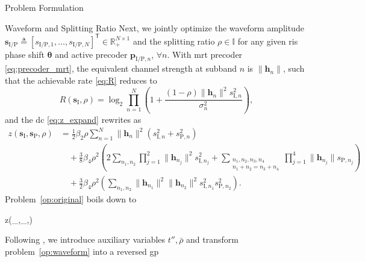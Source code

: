 \begin{section}{Problem Formulation}
	\begin{subsection}{Waveform and Splitting Ratio}
		Next, we jointly optimize the waveform amplitude $\mathbf{s}_{\mathrm{I/P}} \triangleq [s_{\mathrm{I/P},1},\dots,s_{\mathrm{I/P},N}]^\mathsf{T} \in \mathbb{R}_+^{N \times 1}$ and the splitting ratio $\rho \in \mathbb{I}$ for any given \gls{ris} phase shift $\boldsymbol{\theta}$ and active precoder $\mathbf{p}_{\mathrm{I/P},n}$, $\forall n$.
		With \gls{mrt} precoder \eqref{eq:precoder_mrt}, the equivalent channel strength at subband $n$ is $\lVert{\mathbf{h}_n}\rVert$, such that the achievable rate \eqref{eq:R} reduces to
		\begin{equation}\label{eq:R_waveform}
			R(\mathbf{s}_{\mathrm{I}},\rho) = \log_2\prod_{n=1}^N\left(1+\frac{(1-\rho)\lVert{\mathbf{h}_n}\rVert^2 s_{\mathrm{I},n}^2}{\sigma_n^2}\right),
		\end{equation}
		and the \gls{dc} \eqref{eq:z_expand} rewrites as
		\begin{equation}
			\begin{split}
				z(\mathbf{s}_{\mathrm{I}},\mathbf{s}_\mathrm{P},\rho)
				& = \frac{1}{2}{\beta_2}{\rho} \sum_{n=1}^N \lVert{\mathbf{h}_n}\rVert^2(s_{\mathrm{I},n}^2+s_{\mathrm{P},n}^2)\\
				& \quad + \frac{3}{8}{\beta_4}{\rho^2} \left( 2\sum_{n_1,n_2} \prod_{j=1}^2 \lVert{\mathbf{h}_{n_j}}\rVert^2 s_{\mathrm{I},{n_j}}^2 + \sum_{\substack{{n_1},{n_2},{n_3},{n_4}\\{n_1}+{n_2}={n_3}+{n_4}}} \prod_{j=1}^4 \lVert{\mathbf{h}_{n_j}}\rVert s_{\mathrm{P},{n_j}} \right)\\
				& \quad + \frac{3}{2}{\beta_4}{\rho^2} \left( \sum_{n_1,n_2} \lVert{\mathbf{h}_{n_1}}\rVert^2 \lVert{\mathbf{h}_{n_2}}\rVert^2 s_{\mathrm{I},{n_1}}^2 s_{\mathrm{P},{n_2}}^2 \right).\label{eq:z_waveform}
			\end{split}
		\end{equation}
		Problem~\eqref{op:original} boils down to
		\begin{maxi!}
			{}{z(_{},_,\rho)}{\label{op:waveform}}{}
		\end{maxi!}
		Following \cite{Clerckx2018b}, we introduce auxiliary variables $t'',\bar{\rho}$ and transform problem~\eqref{op:waveform} into a reversed \gls{gp}

\end{subsection}
\end{section}
